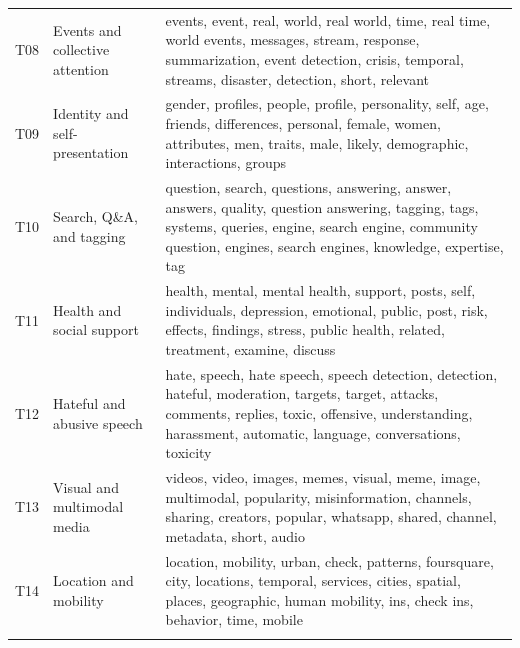 \begin{longtable}{@{}p{}p{}p{}@{}}
T08 & Events and collective attention & events, event, real, world, real world, time, real time, world events, messages, stream, response, summarization, event detection, crisis, temporal, streams, disaster, detection, short, relevant \\ \addlinespace
T09 & Identity and self-presentation & gender, profiles, people, profile, personality, self, age, friends, differences, personal, female, women, attributes, men, traits, male, likely, demographic, interactions, groups \\ \addlinespace
T10 & Search, Q\&A, and tagging & question, search, questions, answering, answer, answers, quality, question answering, tagging, tags, systems, queries, engine, search engine, community question, engines, search engines, knowledge, expertise, tag \\ \addlinespace
T11 & Health and social support & health, mental, mental health, support, posts, self, individuals, depression, emotional, public, post, risk, effects, findings, stress, public health, related, treatment, examine, discuss \\ \addlinespace
T12 & Hateful and abusive speech & hate, speech, hate speech, speech detection, detection, hateful, moderation, targets, target, attacks, comments, replies, toxic, offensive, understanding, harassment, automatic, language, conversations, toxicity \\ \addlinespace
T13 & Visual and multimodal media & videos, video, images, memes, visual, meme, image, multimodal, popularity, misinformation, channels, sharing, creators, popular, whatsapp, shared, channel, metadata, short, audio \\ \addlinespace
T14 & Location and mobility & location, mobility, urban, check, patterns, foursquare, city, locations, temporal, services, cities, spatial, places, geographic, human mobility, ins, check ins, behavior, time, mobile \\ \addlinespace
\end{longtable}
\endgroup
